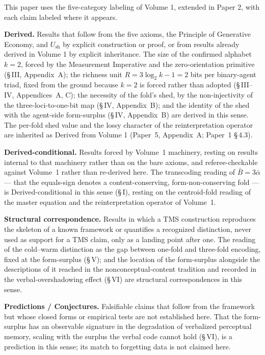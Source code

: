 \documentclass[11pt,oneside]{report}
\theoremstyle{definition}
\theoremstyle{remark}
\begin{document}
This paper uses the five-category labeling of Volume 1, extended in Paper 2,
with each claim labeled where it appears.

\textbf{Derived.} Results that follow from the five axioms, the Principle of
Generative Economy, and \ensuremath{U_{\mathrm{sh}}} by explicit construction or
proof, or from results already derived in Volume 1 by explicit inheritance. The
size of the confirmed alphabet \ensuremath{k = 2}, forced by the Measurement
Imperative and the zero-orientation primitive (\S\,III, Appendix~A); the richness
unit \ensuremath{R = 3\log_2 k - 1 = 2} bits per binary-agent triad, fixed from the
ground because \ensuremath{k = 2} is forced rather than adopted (\S\,III--IV,
Appendices~A, C); the necessity of the fold's shed, by the non-injectivity of the
three-loci-to-one-bit map (\S\,IV, Appendix~B); and the identity of the shed with
the agent-side form-surplus (\S\,IV, Appendix~B) are derived in this sense. The
per-fold shed value and the lossy character of the reinterpretation operator are
inherited as Derived from Volume 1 (Paper~5, Appendix~A; Paper~1 \S\,4.3).

\textbf{Derived-conditional.} Results forced by Volume~1 machinery, resting on
results internal to that machinery rather than on the bare axioms, and
referee-checkable against Volume~1 rather than re-derived here. The transcoding
reading of \ensuremath{\bar{B} = 3\bar{\alpha}} --- that the equals-sign denotes a
content-conserving, form-non-conserving fold --- is Derived-conditional in this
sense (\S\,I), resting on the centroid-fold reading of the master equation and the
reinterpretation operator of Volume~1.

\textbf{Structural correspondence.} Results in which a TMS construction reproduces
the skeleton of a known framework or quantifies a recognized distinction, never
used as support for a TMS claim, only as a landing point after one. The reading of
the cold--warm distinction as the gap between one-fold and three-fold encoding,
fixed at the form-surplus (\S\,V); and the location of the form-surplus alongside
the descriptions of it reached in the nonconceptual-content tradition and recorded
in the verbal-overshadowing effect (\S\,VI) are structural correspondences in this
sense.

\textbf{Predictions / Conjectures.} Falsifiable claims that follow from the
framework but whose closed forms or empirical tests are not established here. That
the form-surplus has an observable signature in the degradation of verbalized
perceptual memory, scaling with the surplus the verbal code cannot hold (\S\,VI),
is a prediction in this sense; its match to forgetting data is not claimed here.
\end{document}
